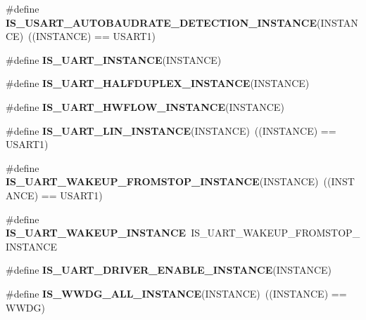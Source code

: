 \begin{DoxyCompactItemize}
\item 
\mbox{\label{group___exported__macro_ga4130cef42f8cada5a91c38b85f76939e}} 
\#define {\bfseries I\+S\+\_\+\+U\+S\+A\+R\+T\+\_\+\+A\+U\+T\+O\+B\+A\+U\+D\+R\+A\+T\+E\+\_\+\+D\+E\+T\+E\+C\+T\+I\+O\+N\+\_\+\+I\+N\+S\+T\+A\+N\+CE}(I\+N\+S\+T\+A\+N\+CE)~((I\+N\+S\+T\+A\+N\+CE) == U\+S\+A\+R\+T1)
\item 
\#define {\bfseries I\+S\+\_\+\+U\+A\+R\+T\+\_\+\+I\+N\+S\+T\+A\+N\+CE}(I\+N\+S\+T\+A\+N\+CE)
\item 
\#define {\bfseries I\+S\+\_\+\+U\+A\+R\+T\+\_\+\+H\+A\+L\+F\+D\+U\+P\+L\+E\+X\+\_\+\+I\+N\+S\+T\+A\+N\+CE}(I\+N\+S\+T\+A\+N\+CE)
\item 
\#define {\bfseries I\+S\+\_\+\+U\+A\+R\+T\+\_\+\+H\+W\+F\+L\+O\+W\+\_\+\+I\+N\+S\+T\+A\+N\+CE}(I\+N\+S\+T\+A\+N\+CE)
\item 
\mbox{\label{group___exported__macro_ga7d2763df993c77cfa6e249ec7bc80482}} 
\#define {\bfseries I\+S\+\_\+\+U\+A\+R\+T\+\_\+\+L\+I\+N\+\_\+\+I\+N\+S\+T\+A\+N\+CE}(I\+N\+S\+T\+A\+N\+CE)~((I\+N\+S\+T\+A\+N\+CE) == U\+S\+A\+R\+T1)
\item 
\mbox{\label{group___exported__macro_ga6303097822ab1977cc83f05319a10f1e}} 
\#define {\bfseries I\+S\+\_\+\+U\+A\+R\+T\+\_\+\+W\+A\+K\+E\+U\+P\+\_\+\+F\+R\+O\+M\+S\+T\+O\+P\+\_\+\+I\+N\+S\+T\+A\+N\+CE}(I\+N\+S\+T\+A\+N\+CE)~((I\+N\+S\+T\+A\+N\+CE) == U\+S\+A\+R\+T1)
\item 
\mbox{\label{group___exported__macro_ga69e32d838272d886316fcfa378605ed0}} 
\#define {\bfseries I\+S\+\_\+\+U\+A\+R\+T\+\_\+\+W\+A\+K\+E\+U\+P\+\_\+\+I\+N\+S\+T\+A\+N\+CE}~I\+S\+\_\+\+U\+A\+R\+T\+\_\+\+W\+A\+K\+E\+U\+P\+\_\+\+F\+R\+O\+M\+S\+T\+O\+P\+\_\+\+I\+N\+S\+T\+A\+N\+CE
\item 
\#define {\bfseries I\+S\+\_\+\+U\+A\+R\+T\+\_\+\+D\+R\+I\+V\+E\+R\+\_\+\+E\+N\+A\+B\+L\+E\+\_\+\+I\+N\+S\+T\+A\+N\+CE}(I\+N\+S\+T\+A\+N\+CE)
\item 
\mbox{\label{group___exported__macro_gac2a8aaec233e19987232455643a04d6f}} 
\#define {\bfseries I\+S\+\_\+\+W\+W\+D\+G\+\_\+\+A\+L\+L\+\_\+\+I\+N\+S\+T\+A\+N\+CE}(I\+N\+S\+T\+A\+N\+CE)~((I\+N\+S\+T\+A\+N\+CE) == W\+W\+DG)
\item 
\mbox{\label{group___exported__macro_ga2204b62b378bcf08b3b9006c184c7c23}} 

\end{DoxyCompactItemize}
